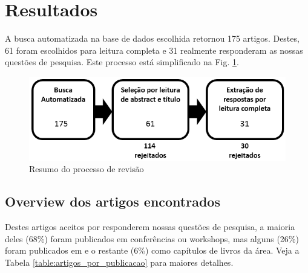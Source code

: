 \section{Resultados}


A busca automatizada na base de dados escolhida retornou 175 artigos. Destes, 61 foram escolhidos para leitura completa e 31 realmente responderam as nossas questões de pesquisa. Este processo está simplificado na Fig. \ref{fig:processo_revisao}.

\begin{figure}[!t]
\captionsetup{justification=centering}
\centering
\includegraphics[scale=0.5]{images/Resumo_Metodologia}
\caption{Resumo do processo de revisão}
\label{fig:processo_revisao}
\end{figure}

\subsection{Overview dos artigos encontrados}

Destes artigos aceitos por responderem nossas questões de pesquisa, a maioria deles (68\%) foram publicados em conferências ou workshops, mas alguns (26\%) foram publicados em e o restante (6\%) como capítulos de livros da área. Veja a Tabela \ref{table:artigos_por_publicacao} para maiores detalhes.


